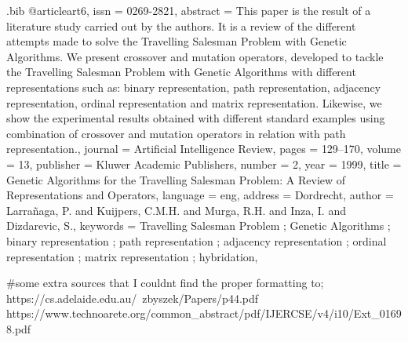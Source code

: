 \begin{filecontents}{\jobname.bib}
	@article{art6,
		issn = {0269-2821},
		abstract = {This paper is the result of a literature study carried out by the authors. It is a review of the different attempts made to solve the Travelling Salesman Problem with Genetic Algorithms. We present crossover and mutation operators, developed to tackle the Travelling Salesman Problem with Genetic Algorithms with different representations such as: binary representation, path representation, adjacency representation, ordinal representation and matrix representation. Likewise, we show the experimental results obtained with different standard examples using combination of crossover and mutation operators in relation with path representation.},
		journal = {Artificial Intelligence Review},
		pages = {129--170},
		volume = {13},
		publisher = {Kluwer Academic Publishers},
		number = {2},
		year = {1999},
		title = {Genetic Algorithms for the Travelling Salesman Problem: A Review of Representations and Operators},
		language = {eng},
		address = {Dordrecht},
		author = {Larra\~naga, P. and Kuijpers, C.M.H. and Murga, R.H. and Inza, I. and Dizdarevic, S.},
		keywords = {Travelling Salesman Problem ; Genetic Algorithms ; binary representation ; path representation ; adjacency representation ; ordinal representation ; matrix representation ; hybridation},
	}
	
	#some extra sources that I couldnt find the proper formatting to;
	https://cs.adelaide.edu.au/~zbyszek/Papers/p44.pdf
	https://www.technoarete.org/common_abstract/pdf/IJERCSE/v4/i10/Ext_01698.pdf
	
\end{filecontents}


\documentclass{article}

\usepackage{3201proj}
\usepackage[utf8]{inputenc}

\usepackage{biblatex}



	{
		\parindent=0pt
		\bfseries
		Memorial University of Newfoundland \hfill Fall Semester 2018 
		
		Computer Science 3201 \hfill Submitted November 9\textsuperscript{th}
		
		\vskip 2pc
		
		{
			\Large \hfill Course Project Proposal \hfill
		}
	}
	
	\paragraph{Group Members:} Omar Mohamed (201501962), Jacob House (201614260), Nabil Miri (201547429), and Hassan El-Khatib (201504396)
	
